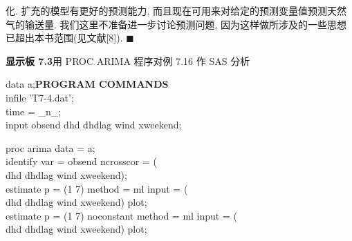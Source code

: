 
化. 扩充的模型有更好的预测能力, 而且现在可用来对给定的预测变量值预测天然气的输送量. 我们这里不准备进一步讨论预测问题, 因为这样做所涉及的一些思想已超出本书范围(见文献[8]). \hfill$\blacksquare$

\medskip
\noindent\textbf{显示板 7.3}\quad 用 PROC ARIMA 程序对例 7.16 作 SAS 分析

\begin{mvbox}
{\ttfamily\small
data a;\hfill\textbf{\rmfamily PROGRAM COMMANDS}\\
infile 'T7-4.dat';\\
time = \_n\_;\\
input obsend dhd dhdlag wind xweekend;\\
\par\vspace{8pt}
proc arima data = a;\\
identify var = obsend ncrosscor = (\\
\hspace*{2em}dhd dhdlag wind xweekend);\\
estimate p = (1 7) method = ml input = (\\
\hspace*{2em}dhd dhdlag wind xweekend) plot;\\
estimate p = (1 7) noconstant method = ml input = (\\
\hspace*{2em}dhd dhdlag wind xweekend) plot;
\par}
\end{mvbox}

